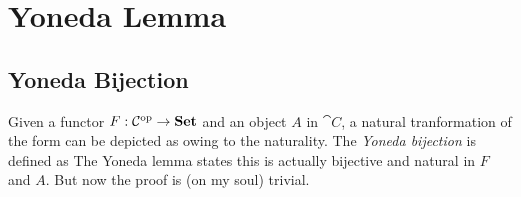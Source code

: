 \section{Yoneda Lemma}

\subsection{Yoneda Bijection}

Given a functor $F : \mathcal{C}^{\operatorname{op}} \to \boldsymbol{\mathrm{Set}}$ and an object $A$ in $\cat{C}$, %
a natural tranformation of the form
can be depicted as
owing to the naturality. The \textit{Yoneda bijection} is defined as 
The Yoneda lemma states this is actually bijective and natural in $F$ and $A$. %
But now the proof is (on my soul) trivial.


